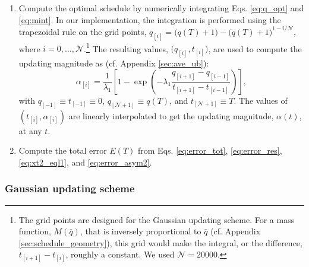 \documentclass[reprint, superscriptaddress, floatfix]{revtex4-1}
\newcommand{\Err}{E}
\begin{document}
\begin{enumerate}
\item \label{step:alpha}
Compute the optimal schedule by
numerically integrating Eqs. \eqref{eq:q_opt} and \eqref{eq:mint}.
%
In our implementation,
the integration is performed using the trapezoidal rule\cite{press3rd}
on the grid points,
$q_{[i]} = \bigl(q(T) + 1\bigr) - \bigl(q(T)+1\bigr)^{1-i/\mathcal N}$,
where $i = 0, \dots, \mathcal N$.\footnote{The
  grid points are designed for the Gaussian updating scheme.
  For a mass function, $M(\bar q)$, that is
  inversely proportional to $\bar q$
  (cf. Appendix \ref{sec:schedule_geometry}),
  this grid would make the integral,
  or the difference, $t_{[i+1]} - t_{[i]}$,
  roughly a constant.
  We used $\mathcal N = 20000$.}
%
The resulting values, $\bigl(q_{[i]}, t_{[i]} \bigr)$,
are used to compute the updating magnitude
as (cf. Appendix \ref{sec:ave_ub}):
\begin{equation}
  \alpha_{[i]}
  =
  \frac{1}{\lambda_1}
  \left[
    1
    -
    \exp\left(
    -\lambda_1
    \frac{ q_{[i+1]} - q_{[i-1]} }
         { t_{[i+1]} - t_{[i-1]} }
    \right)
  \right]
  ,
  \label{eq:alphai}
\end{equation}
with
$q_{[ -1]} \equiv t_{[-1]} \equiv 0$,
$q_{[\mathcal N+1]} \equiv q(T)$,
and
$t_{[\mathcal N+1]} \equiv T$.
%
The values of $(t_{[i]}, \alpha_{[i]})$
are linearly interpolated
to get the updating magnitude, $\alpha(t)$, at any $t$.


\item
Compute the total error $\Err(T)$ from
Eqs.
\eqref{eq:error_tot},
\eqref{eq:error_res},
\eqref{eq:xt2_eql1},
and
\eqref{eq:error_asym2}.

\end{enumerate}

%



\subsubsection{\label{sec:Gaussian_scheme}
Gaussian updating scheme}
\end{document}
